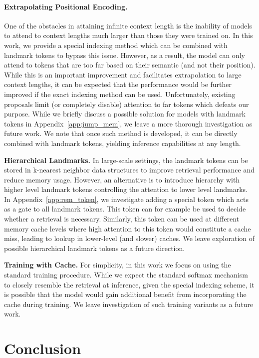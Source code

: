 \paragraph{Extrapolating Positional Encoding.} One of the obstacles in attaining infinite context length is the inability of models to attend to context lengths much larger than those they were trained on. In this work, we provide a special indexing method which can be combined with landmark tokens to bypass this issue. However, as a result, the model can only attend to tokens that are too far based on their semantic (and not their position).  While this is an important improvement and facilitates extrapolation to large context lengths, it can be expected that the performance would be further improved if the exact indexing method can be used. Unfortunately, existing proposals limit (or completely disable) attention to far tokens which defeats our purpose. While we briefly discuss a possible solution for models with landmark tokens in Appendix~\ref{app:jump_mem}, we leave a more thorough investigation as future work. We note that once such method is developed, it can be directly combined with landmark tokens, yielding inference capabilities at any length.

\textbf{Hierarchical Landmarks.} In large-scale settings, the landmark tokens can be stored in k-nearest neighbor data structures to improve retrieval performance and reduce memory usage. However, an alternative is to introduce hierarchy with higher level landmark tokens controlling the attention to lower level landmarks. In Appendix~\ref{app:rem_token}, we investigate adding a special token which acts as a gate to all landmark tokens. This token can for example be used to decide whether a retrieval is necessary. Similarly, this token can be used at different memory cache levels where high attention to this token would constitute a cache miss, leading to lookup in lower-level (and slower) caches. We leave exploration of possible hierarchical landmark tokens as a future direction.

\textbf{Training with Cache.} For simplicity, in this work we focus on using the standard training procedure. While we expect the standard softmax mechanism to closely resemble the retrieval at inference, given the special indexing scheme, it is possible that the model would gain additional benefit from incorporating the cache during training. We leave investigation of such training variants as a future work. 

\section{Conclusion}

